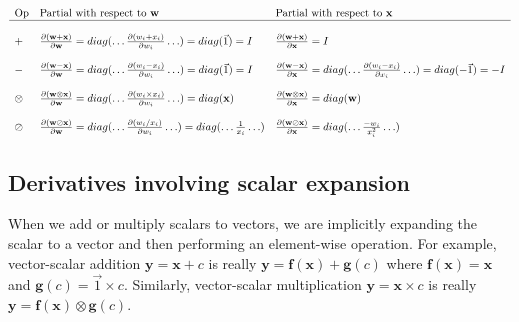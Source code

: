 \documentclass[11pt]{article}
\begin{document}
$
\begin{array}{lllll}
\text{Op} & \text{Partial with respect to } \mathbf{w} & \text{Partial with respect to }\mathbf{x}\\
\hline\\

+ & \frac{\partial (\mathbf{w+x})}{\partial \mathbf{w}} = diag(\ldots \frac{\partial (w_i + x_i)}{\partial w_i} \ldots) = diag(\vec{1}) = I & \frac{\partial (\mathbf{w+x})}{\partial \mathbf{x}} =  I\\\\

- & \frac{\partial (\mathbf{w-x})}{\partial \mathbf{w}}  =  diag(\ldots\frac{\partial (w_i - x_i)}{\partial w_i}\ldots) =  diag(\vec{1})  =  I & \frac{\partial (\mathbf{w-x})}{\partial \mathbf{x}}  =  diag(\ldots\frac{\partial (w_i - x_i)}{\partial x_i}\ldots)  =  diag(-\vec{1})  =  -I \\\\

\otimes & \frac{\partial (\mathbf{w \otimes x})}{\partial \mathbf{w}}  =  diag(\ldots\frac{\partial (w_i \times x_i)}{\partial w_i} \ldots)  =  diag(\mathbf{x}) & \frac{\partial (\mathbf{w \otimes x})}{\partial \mathbf{x}}  =  diag(\mathbf{w})\\\\

\oslash & \frac{\partial (\mathbf{w \oslash x})}{\partial \mathbf{w}}  =  diag(\ldots\frac{\partial (w_i / x_i)}{\partial w_i}\ldots)  =  diag(\ldots \frac{1}{x_i} \ldots) & \frac{\partial (\mathbf{w \oslash x})}{\partial \mathbf{x}}  =  diag(\ldots \frac{-w_i}{x_i^2} \ldots)\\

\end{array}
$

\subsection{Derivatives involving scalar expansion}

When we add or multiply scalars to vectors, we are implicitly expanding the scalar to a vector and then performing an element-wise operation. For example, vector-scalar addition 
$\mathbf{y} = \mathbf{x} + c$
is really
$\mathbf{y} = \mathbf{f(x)} + \mathbf{g}(c)$ where $\mathbf{f(x)} = \mathbf{x}$ and $\mathbf{g}(c) = \vec{1} \times c$.
Similarly, vector-scalar multiplication
$\mathbf{y} = \mathbf{x} \times c$
is really
$\mathbf{y} = \mathbf{f(x)} \otimes \mathbf{g}(c)$.
\end{document}
